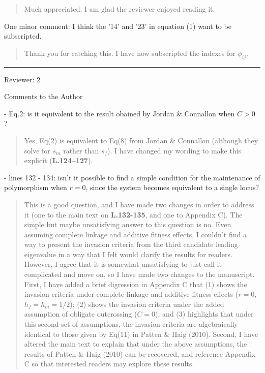 \documentclass[11pt]{article}
\begin{document}
	\begin{quote}
		Much appreciated. I am glad the reviewer enjoyed reading it.
	\end{quote}

\noindent One minor comment: I think the '14' and '23' in equation (1) want to be subscripted.

	\begin{quote}
		Thank you for catching this. I have now subscripted the indexes for $\phi_{ij}$.
	\end{quote}



\bigskip
\noindent \rule{8cm}{0.4pt}
\bigskip



\noindent Reviewer: 2
\bigskip

\noindent Comments to the Author
\bigskip

 - Eq.2: is it equivalent to the result obained by Jordan \& Connallon when $C > 0$ ?

	\begin{quote}
		Yes, Eq(2) is equivalent to Eq(8) from Jordan \& Connallon (although they solve for $s_m$ rather than $s_f$). I have changed my wording to make this explicit (\textbf{L.124--127}).
	\end{quote}

 - lines 132 - 134: isn't it possible to find a simple condition for the maintenance of polymorphism when $r=0$, since the system becomes equivalent to a single locus?

	\begin{quote}
		This is a good question, and I have made two changes in order to address it (one to the main text on \textbf{L.132-135}, and one to Appendix C). The simple but maybe unsatisfying answer to this question is no. Even assuming complete linkage and additive fitness effects, I couldn't find a way to present the invasion criteria from the third candidate leading eigenvalue in a way that I felt would clarify the results for readers. However, I agree that it is somewhat unsatisfying to just call it complicated and move on, so I have made two changes to the manuscript. First, I have added a brief digression in Appendix C that (1) shows the invasion criteria under complete linkage and additive fitness effects ($r=0$, $h_f=h_m=1/2$); (2) shows the invasion criteria under the added assumption of obligate outcrossing ($C=0$); and (3) highlights that under this second set of assumptions, the invasion criteria are algebraically identical to those given by Eq(11) in Patten \& Haig (2010). Second, I have altered the main text to explain that under the above assumptions, the results of Patten \& Haig (2010) can be recovered, and reference Appendix C so that interested readers may explore these results.
	\end{quote}
\end{document}
